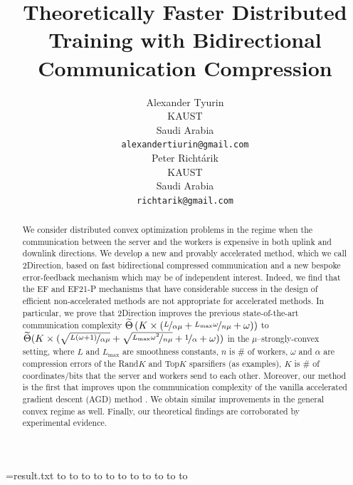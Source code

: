 \documentclass{article} %
\title{\algnamebig{2Direction:} Theoretically Faster Distributed Training with Bidirectional Communication Compression}
\author{%
  Alexander Tyurin\\
  KAUST\\
  Saudi Arabia\\
  \texttt{alexandertiurin@gmail.com} \\
  \And
  Peter Richt\'{a}rik \\
  KAUST\\
  Saudi Arabia\\
  \texttt{richtarik@gmail.com} \\
}
\theoremstyle{plain}
\theoremstyle{definition}
\theoremstyle{remark}
\newcommand{\green}{\color{mydarkgreen}}
\newcommand{\algname}[1]{{\small\green\sf #1}}
\begin{document}

\newread\myread
\openin\myread=result.txt
\read\myread to \formulakappaexpand
\read\myread to \formulakappaconst
\read\myread to \formulakappasol
\read\myread to \formularhoexpand
\read\myread to \formularhoconst
\read\myread to \formularhosol
\read\myread to \formulabregman
\read\myread to \formulabregmanconst
\read\myread to \formuladist
\read\myread to \formuladistconst
\read\myread to \formulafollows

\maketitle

\begin{abstract}
  We consider distributed convex optimization problems in the regime when the communication between the server and the workers is expensive in both uplink and downlink directions. We develop a new and provably accelerated method, which we call \algname{2Direction}, based on fast bidirectional compressed communication and a new bespoke error-feedback mechanism which may be of independent interest. Indeed, we find that the \algname{EF} and \algname{EF21-P} mechanisms \citep{Seide2014, gruntkowska2022ef21} that have considerable success in the design of efficient non-accelerated methods are not appropriate for accelerated methods. In particular, we prove that \algname{2Direction} improves the previous state-of-the-art communication complexity $\widetilde{\Theta}\left(K \times \left(\nicefrac{L}{\alpha \mu} + \nicefrac{L_{\max} \omega}{n \mu} + \omega\right)\right)$ \citep{gruntkowska2022ef21} to $\widetilde{\Theta}(K \times (\sqrt{\nicefrac{L (\omega + 1)}{\alpha \mu}} + \sqrt{\nicefrac{L_{\max} \omega^2}{n \mu}} + \nicefrac{1}{\alpha} + \omega))$ in the $\mu$--strongly-convex setting, where $L$ and $L_{\max}$ are smoothness constants, $n$ is \# of workers, $\omega$ and $\alpha$ are compression errors of the Rand$K$ and Top$K$ sparsifiers (as examples), $K$ is \# of coordinates/bits that the server and workers send to each other. Moreover, our method is the first that improves upon the communication complexity of the vanilla accelerated gradient descent (\algname{AGD}) method \citep{nesterov2018lectures}. We obtain similar improvements in the general convex regime as well. Finally, our theoretical findings are corroborated by experimental evidence.
\end{abstract}
\end{document}

